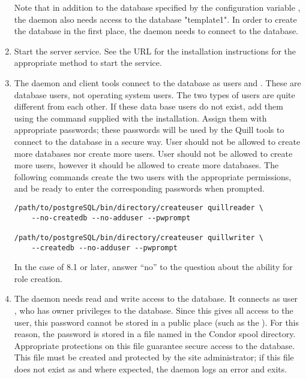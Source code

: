 \begin{enumerate}
Note that in addition to the database specified by
the configuration variable ,
the  daemon also needs access to the database
"template1".
In order to create the database in the first place, 
the  daemon needs to connect to the database.

\item Start the  server service. See the URL for the
installation instructions for the appropriate method to start the service.

\item The  daemon and client tools connect
to the database as users  and 
.
These are database users, not operating system users.
The two types of users are quite different from each other.
If these data base users do not exist,
add them using the 
 command supplied with the installation.
Assign them with appropriate passwords;
these passwords will be used by the Quill tools to connect
to the database in a secure way.
User  should not be allowed to create
more databases nor create more users.
User  should
not be allowed to create more users,
however it should be allowed to create more databases.
The following commands create the two users
with the appropriate permissions,
and be ready to enter the corresponding passwords when prompted.

\footnotesize
\begin{verbatim}
/path/to/postgreSQL/bin/directory/createuser quillreader \
	--no-createdb --no-adduser --pwprompt

/path/to/postgreSQL/bin/directory/createuser quillwriter \
	--createdb --no-adduser --pwprompt
\end{verbatim}
\normalsize

In the case of  8.1 or later, answer ``no'' to the question
about the ability for role creation.

\item The  daemon needs read and write access
to the database.
It connects as user ,
who has owner privileges to the database.
Since this gives all access to the  user,
this password cannot be stored in a public place 
(such as the \Condor{collector}).
For this reason, the \Username{quillwriter} password is stored
in a file named  in the Condor spool directory.
Appropriate protections on this file guarantee secure access to the database.
This file must be created and protected by the site administrator;
if this file does not exist as and where expected, the \Condor{quill}
daemon logs an error and exits.

\end{enumerate}


